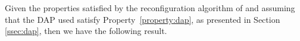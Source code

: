 

Given the properties satisfied by the reconfiguration algorithm of \ares{} 
and assuming that the DAP used satisfy Property~\ref{property:dap}, as presented
in Section \ref{ssec:dap}, then  we have the following result. 

